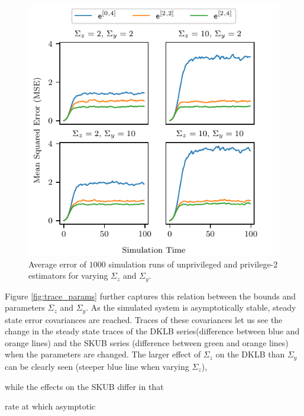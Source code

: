 \documentclass[conference]{IEEEtran}
\theoremstyle{definition}
\theoremstyle{remark}
\begin{document}
\begin{figure}[htbp]
  \centering
  \includegraphics{figures/mse_params.pdf}
  \caption{Average error of $1000$ simulation runs of unprivileged and privilege-$2$ estimators for varying $\Sigma_z$ and $\Sigma_y$.}
  \label{fig:mse_params}
\end{figure}
Figure \ref{fig:trace_params} further captures this relation between the bounds and parameters $\Sigma_z$ and $\Sigma_y$. As the simulated system is asymptotically stable, steady state error covariances are reached. Traces of these covariances let us see the change in the steady state traces of the DKLB series(difference between blue and orange lines) and the SKUB series (difference between green and orange lines) when the parameters are changed. The larger effect of $\Sigma_z$ on the DKLB than $\Sigma_y$ can be clearly seen (steeper blue line when varying $\Sigma_z$), 

while the effects on the SKUB differ in that 

rate at which asymptotic 
\end{document}
